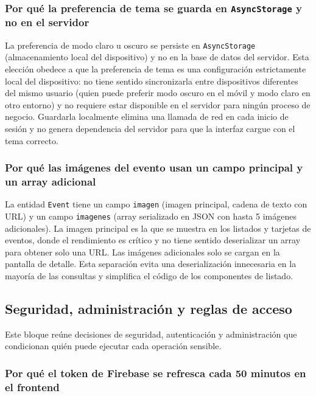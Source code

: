 \subsubsection{Por qué la preferencia de tema se guarda en \texttt{AsyncStorage} y no en el servidor}

La preferencia de modo claro u oscuro se persiste en \texttt{AsyncStorage} (almacenamiento local del dispositivo) y no en la base de datos del servidor. Esta elección obedece a que la preferencia de tema es una configuración estrictamente local del dispositivo: no tiene sentido sincronizarla entre dispositivos diferentes del mismo usuario (quien puede preferir modo oscuro en el móvil y modo claro en otro entorno) y no requiere estar disponible en el servidor para ningún proceso de negocio. Guardarla localmente elimina una llamada de red en cada inicio de sesión y no genera dependencia del servidor para que la interfaz cargue con el tema correcto.

\subsubsection{Por qué las imágenes del evento usan un campo principal y un array adicional}

La entidad \texttt{Event} tiene un campo \texttt{imagen} (imagen principal, cadena de texto con URL) y un campo \texttt{imagenes} (array serializado en JSON con hasta 5 imágenes adicionales). La imagen principal es la que se muestra en los listados y tarjetas de eventos, donde el rendimiento es crítico y no tiene sentido deserializar un array para obtener solo una URL. Las imágenes adicionales solo se cargan en la pantalla de detalle. Esta separación evita una deserialización innecesaria en la mayoría de las consultas y simplifica el código de los componentes de listado.

\subsection{Seguridad, administración y reglas de acceso}

Este bloque reúne decisiones de seguridad, autenticación y administración que condicionan quién puede ejecutar cada operación sensible.

\subsubsection{Por qué el token de Firebase se refresca cada 50 minutos en el frontend}

